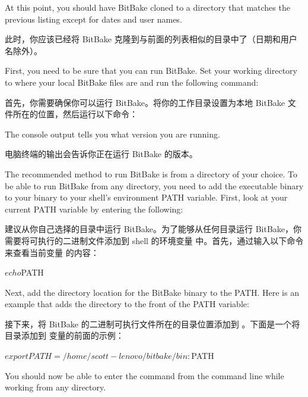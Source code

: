 At this point, you should have BitBake cloned to a directory that matches the previous listing except for dates and user names.

此时，你应该已经将 BitBake 克隆到与前面的列表相似的目录中了（日期和用户名除外）。


First, you need to be sure that you can run BitBake. Set your working directory to where your local BitBake files are and run the following command:

首先，你需要确保你可以运行 BitBake。将你的工作目录设置为本地 BitBake 文件所在的位置，然后运行以下命令：


The console output tells you what version you are running.

电脑终端的输出会告诉你正在运行 BitBake 的版本。

The recommended method to run BitBake is from a directory of your choice. To be able to run BitBake from any directory, you need to add the executable binary to your binary to your shell’s environment PATH variable. First, look at your current PATH variable by entering the following:

建议从你自己选择的目录中运行 BitBake。为了能够从任何目录运行 BitBake，你需要将可执行的二进制文件添加到 shell 的环境变量  中。首先，通过输入以下命令来查看当前变量 的内容：

\begin{pyglist}
$ echo $PATH
\end{pyglist}

Next, add the directory location for the BitBake binary to the PATH. Here is an example that adds the  directory to the front of the PATH variable:

接下来，将 BitBake 的二进制可执行文件所在的目录位置添加到 。下面是一个将  目录添加到  变量的前面的示例：

\begin{pyglist}
$ export PATH=/home/scott-lenovo/bitbake/bin:$PATH
\end{pyglist}

You should now be able to enter the  command from the command line while working from any directory.

